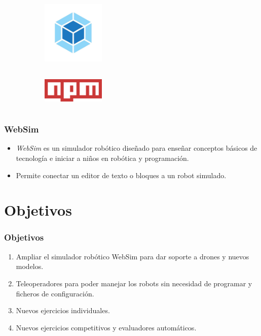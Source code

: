 \documentclass[xcolor={table}]{beamer}
\begin{document}
\begin{frame}
\begin{figure}[H]
\begin{subfigure}{\textwidth}
                \label{fig:figure2_7}
                \end{subfigure}\hfill
                    \begin{subfigure}{\textwidth}
                        \includegraphics[width=3cm, height=3cm]{img/webpack.jpeg}
                    \label{fig:figure2_9}
                    \end{subfigure}\hfill
                    \begin{subfigure}{\textwidth}
                        \includegraphics[width=3cm, height=2cm]{img/npm.png}
                    \label{fig:figure2_8}
                    \end{subfigure}\hfill
                    \label{fig:herramientas}
                    \end{figure}
        \end{frame}
        
	\begin{frame}
	\frametitle{WebSim}
	\begin{itemize}
	    \item \textit{WebSim} es un simulador robótico diseñado para enseñar conceptos básicos de tecnología e iniciar a niños en robótica y programación.
	    
	    \item Permite conectar un editor de texto o bloques a un robot simulado. 
	\end{itemize}
\end{frame}
		
	\section{Objetivos}
		\begin{frame}
			\frametitle{Objetivos}
			\begin{enumerate}
				\item Ampliar el simulador robótico WebSim para dar soporte a drones y nuevos modelos.
				
				\item Teleoperadores para poder manejar los robots sin necesidad de programar y ficheros de configuración.
			
				\item Nuevos ejercicios individuales. 
				\item Nuevos ejercicios competitivos y evaluadores automáticos. 
			\end{enumerate}
		\end{frame}
\end{document}
